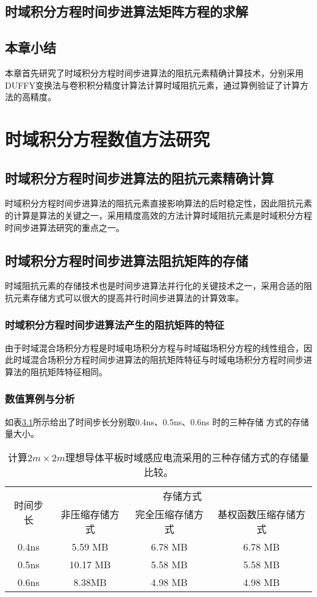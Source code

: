\documentclass[promaster]{thesis-uestc}
\begin{document}
\section{时域积分方程时间步进算法矩阵方程的求解}

\section{本章小结}
本章首先研究了时域积分方程时间步进算法的阻抗元素精确计算技术，分别采用DUFFY变换法与卷积积分精度计算法计算时域阻抗元素，通过算例验证了计算方法的高精度。

\chapter{时域积分方程数值方法研究}
\section{时域积分方程时间步进算法的阻抗元素精确计算}
时域积分方程时间步进算法的阻抗元素直接影响算法的后时稳定性，因此阻抗元素的计算是算法的关键之一，采用精度高效的方法计算时域阻抗元素是时域积分方程时间步进算法研究的重点之一。

\section{时域积分方程时间步进算法阻抗矩阵的存储}
时域阻抗元素的存储技术也是时间步进算法并行化的关键技术之一，采用合适的阻抗元素存储方式可以很大的提高并行时间步进算法的计算效率。

\subsection{时域积分方程时间步进算法产生的阻抗矩阵的特征}
由于时域混合场积分方程是时域电场积分方程与时域磁场积分方程的线性组合，因此时域混合场积分方程时间步进算法的阻抗矩阵特征与时域电场积分方程时间步进算法的阻抗矩阵特征相同。

\subsection{数值算例与分析}
如表\ref{tablea}所示给出了时间步长分别取0.4ns、0.5ns、0.6ns 时的三种存储
方式的存储量大小。

\begin{table}[h]
\caption{计算$2m\times 2m$理想导体平板时域感应电流采用的三种存储方式的存储量比较。}
\begin{tabular}{cccc}
\toprule
\multirow{2}{*}{时间步长} & \multicolumn{3}{c}{存储方式} \\
\cmidrule{2-4}
& 非压缩存储方式 & 完全压缩存储方式 & 基权函数压缩存储方式 \\
\midrule
0.4ns & 5.59 MB & 6.78 MB & 6.78 MB\\
0.5ns & 10.17 MB & 5.58 MB & 5.58 MB \\
0.6ns & 8.38MB & 4.98 MB & 4.98 MB \\
\bottomrule
\end{tabular}
\label{tablea}
\end{table}
\end{document}
